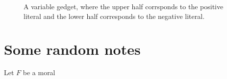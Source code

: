 \begin{figure}
\caption{A variable gedget, where the upper half corrsponds to the positive literal and the lower half corresponds to the negative literal.}
\end{figure}
\fi

\iffalse
\section{Unique prime decomposition}
The concept of simplicial decomposition of graphs was discussed by \cite{wagner1937eigenschaft}, \cite{halin1964simpliziale}, and \cite{diestel1987simplicial}. One of the important proofs is that any finite graphs (don't care about infinite graphs) has a prime decomposition, and such prime decomposition is unique. 
\fi

\section{Some random notes}
\begin{proposition}
Let $F$ be a moral 
\end{proposition}

